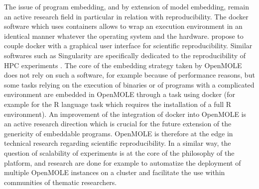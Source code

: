 \documentclass[10pt]{article}
\begin{document}
The issue of program embedding, and by extension of model embedding, remain an active research field in particular in relation with reproducibility. The docker software which uses containers allows to wrap an execution environment in an identical manner whatever the operating system and the hardware. \cite{hung2016guidock} propose to couple docker with a graphical user interface for scientific reproducibility. Similar softwares such as Singularity are specifically dedicated to the reproducibility of HPC experiments \citep{kurtzer2017singularity}. The core of the embedding strategy taken by OpenMOLE does not rely on such a software, for example because of performance reasons, but some tasks relying on the execution of binaries or of programs with a complicated environment are embedded in OpenMOLE through a task using docker (for example for the R language task which requires the installation of a full R environment). An improvement of the integration of docker into OpenMOLE is an active research direction which is crucial for the future extension of the genericity of embeddable programs. OpenMOLE is therefore at the edge in technical research regarding scientific reproducibility. In a similar way, the question of scalability of experiments is at the core of the philosophy of the platform, and research are done for example to automatize the deployment of multiple OpenMOLE instances on a cluster and facilitate the use within communities of thematic researchers.
\end{document}

